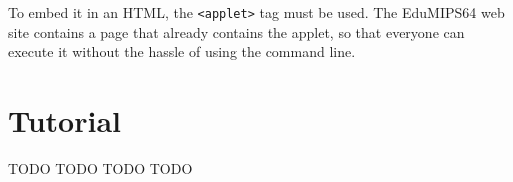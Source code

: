 \documentclass[12pt]{report}
\newcommand{\EM}{EduMIPS64}
\begin{document}
To embed it in an HTML, the \texttt{<applet>} tag must be used. The \EM{} web
site contains a page that already contains the applet, so
that everyone can execute it without the hassle of using the command line.

\chapter{Tutorial}
TODO TODO TODO TODO

\printindex
\end{document}
